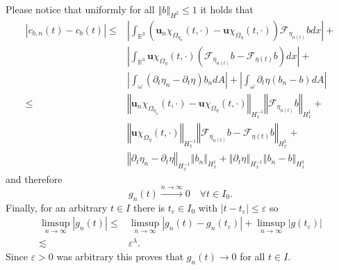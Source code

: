 \documentclass[10pt,a4paper]{article}
\numberwithin{equation}{section}
\begin{document}
Please notice that uniformly for all $\left\Vert b\right\Vert _{H^{2}}\le1$ it holds that
\begin{equation}
\begin{aligned}\left|c_{b,n}\left(t\right)-c_{b}\left(t\right)\right|\le & \left|\int_{\mathbb{R}^{3}}\left(\mathbf{u}_{n}\chi_{\Omega_{\eta_{n}}}\left(t,\cdot\right)-\mathbf{u}\chi_{\Omega_{\eta}}\left(t,\cdot\right)\right)\mathcal{F}_{\eta_{n\left(t\right)}}bdx\right|+\\
 & \left|\int_{\mathbb{R}^{3}}\mathbf{u}\chi_{\Omega_{\eta}}\left(t,\cdot\right)\left(\mathcal{F}_{\eta_{n\left(t\right)}}b-\mathcal{F}_{\eta\left(t\right)}b\right)dx\right|+\\
 & \left|\int_{\omega}\left(\partial_{t}\eta_{n}-\partial_{t}\eta\right)b_{n}dA\right|+\left|\int_{\omega}\partial_{t}\eta\left(b_{n}-b\right)dA\right|\\
\le & \left\Vert \mathbf{u}_{n}\chi_{\Omega_{\eta_{n}}}\left(t,\cdot\right)-\mathbf{u}\chi_{\Omega_{\eta}}\left(t,\cdot\right)\right\Vert _{H_{x}^{-1}}\left\Vert \mathcal{F}_{\eta_{n\left(t\right)}}b\right\Vert _{H_{x}^{1}}+\\
 & \left\Vert \mathbf{u}\chi_{\Omega_{\eta}}\left(t,\cdot\right)\right\Vert _{H_{x}^{-1}}\left\Vert \mathcal{F}_{\eta_{n\left(t\right)}}b-\mathcal{F}_{\eta\left(t\right)}b\right\Vert _{H_{x}^{1}}+\\
 & \left\Vert \partial_{t}\eta_{n}-\partial_{t}\eta\right\Vert _{H_{x}^{-1}}\left\Vert b_{n}\right\Vert _{H_{x}^{1}}+\left\Vert \partial_{t}\eta\right\Vert _{H_{x}^{-1}}\left\Vert b_{n}-b\right\Vert _{H_{x}^{1}}
\end{aligned}
\end{equation}
and therefore 
\begin{equation}
g_{n}\left(t\right)\xrightarrow{n\to\infty}0\quad\forall t\in I_{0}.
\end{equation}
Finally, for an arbitrary $t\in I$ there is $t_ \varepsilon \in I_0$ with $\left|t-t_{\varepsilon}\right|\le\varepsilon$ so 
\begin{equation}
\begin{aligned}\limsup_{n\to\infty}\left|g_{n}\left(t\right)\right|\le & \limsup_{n\to\infty}\left|g_{n}\left(t\right)-g_{n}\left(t_{\varepsilon}\right)\right|+\limsup_{n\to\infty}\left|g\left(t_{\varepsilon}\right)\right|\\
\lesssim & \varepsilon^{\lambda}.
\end{aligned}
\end{equation}
Since $\varepsilon>0$ was arbitrary this proves that $g_{n}(t)\to 0$ for all $t\in I$.
\end{document}
